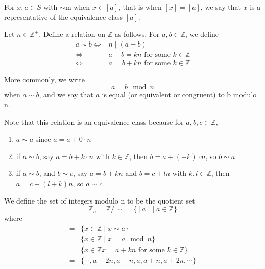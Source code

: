 
\begin{defn}[Representative]
For $x,a\in S$ with $\sim$m when $x\in [a]$, that is when $[x] = [a]$, we say that $x$ is a representative of the equivalence class $[a]$.
\end{defn}

\begin{defn}
Let $n\in\mathbb{Z}^+$. Define a relation on $\mathbb{Z}$ as follows. For $a,b\in\mathbb{Z}$, we define 
\begin{align*}
    a\sim b \Longleftrightarrow & n\mid (a-b) \\
    \Longleftrightarrow & a-b = kn \text{ for some } k\in\mathbb{Z} \\
    \Longleftrightarrow & a= b + kn \text{ for some } k\in\mathbb{Z}
\end{align*}

More commonly, we write \[a = b \mod  n\] when $a\sim b$, and we say that $a$ is equal (or equivalent or congruent) to b modulo n.
\end{defn}

Note that this relation is an equivalence class because for $a,b,c\in\mathbb{Z}$,
\begin{enumerate}
    \item $a\sim a$ since $a = a+0\cdot n$
    \item if $a\sim b$, say $a= b + k\cdot n$ with $k\in\mathbb{Z}$, then $b = a + (-k)\cdot n$, so $b\sim a$
    \item if $a\sim b$, and $b\sim c$, say $a=b+kn$ and $b = c+ln$ with $k,l\in\mathbb{Z}$, then $a= c + (l+k)n$, so $a\sim c$
\end{enumerate}

\begin{defn}
We define the set of integers modulo n to be the quotient set \[\mathbb{Z}_n = \mathbb{Z}/\sim = \{[a]\mid a\in\mathbb{Z}\}\] where 
\begin{align*}
    [a] = & \{x\in\mathbb{Z}\mid x\sim a\} \\
    = & \{x\in \mathbb{Z} \mid x= a \mod  n\} \\
    = & \{x\in\mathbb{Z} x = a+kn \text{ for some } k\in\mathbb{Z}\}\\
    =& \{\cdots,a-2n,a-n,a,a+n,a+2n,\cdots\}
\end{align*}
\end{defn}

